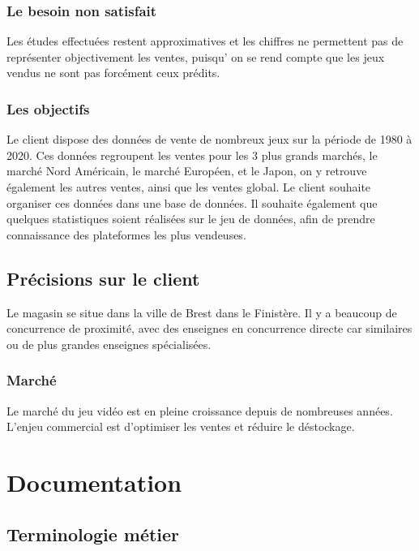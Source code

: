 \documentclass[french]{article}
\begin{document}
\subsubsection{Le besoin non satisfait}

Les études effectuées restent approximatives et les chiffres ne permettent pas de représenter objectivement les ventes, puisqu’ on se rend compte  que les jeux vendus ne sont pas forcément ceux prédits.

\subsubsection{Les objectifs}

Le client dispose des données de vente de nombreux jeux sur la période de 1980 à 2020. Ces données regroupent les ventes pour les 3 plus grands marchés, le marché Nord Américain, le marché Européen, et le Japon, on y retrouve également les autres ventes, ainsi que les ventes global. Le client souhaite organiser ces données dans une base de données. Il souhaite également que quelques statistiques soient réalisées sur le jeu de données, afin de prendre connaissance des plateformes les plus vendeuses.

\subsection{Précisions sur le client}

Le magasin se situe dans la ville de Brest dans le Finistère. Il y a beaucoup de concurrence de proximité, avec des enseignes en concurrence directe car similaires ou de plus grandes enseignes spécialisées.

\subsubsection{Marché}

Le marché du jeu vidéo est en pleine croissance depuis de nombreuses années.
L’enjeu commercial est d’optimiser les ventes et réduire le déstockage.

\section{Documentation}

\subsection{Terminologie métier}
\end{document}
